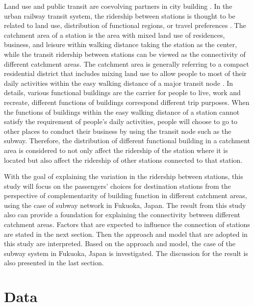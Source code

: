 %
Land use and public transit are coevolving partners in city building \cite{handy2005smart,dittmar2012new}. In the urban railway transit system, the ridership between stations is thought to be related to land use, distribution of functional regions, or travel preferences \cite{thompson1997achieving}. The catchment area of a station is the area with mixed land use of residences, business, and leisure within walking distance taking the station as the center, while the transit ridership between stations can be viewed as the connectivity of different catchment areas. The catchment area is generally referring to a compact residential district that includes mixing land use to allow people to most of their daily activities within the easy walking distance of a major transit node \cite{lund2004travel}. In details, various functional buildings are the carrier for people to live, work and recreate, different functions of buildings correspond different trip purposes. When the functions of buildings within the easy walking distance of a station cannot satisfy the requirement of people’s daily activities, people will choose to go to other places to conduct their business by using the transit node such as the subway. Therefore, the distribution of different functional building in a catchment area is considered to not only affect the ridership of the station where it is located but also affect the ridership of other stations connected to that station.

%
With the goal of explaining the variation in the ridership between stations, this study will focus on the passengers’ choices for destination stations from the perspective of complementarity of building function in different catchment areas, using the case of subway network in Fukuoka, Japan. The result from this study also can provide a foundation for explaining the connectivity between different catchment areas. Factors that are expected to influence the connection of stations are stated in the next section. Then the approach and model that are adopted in this study are interpreted. Based on the approach and model, the case of the subway system in Fukuoka, Japan is investigated. The discussion for the result is also presented in the last section.

%
\section{Data}

%
